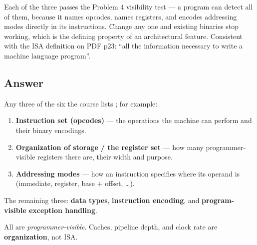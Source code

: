 Each of the three passes the Problem 4 visibility test — a program can detect
all of them, because it names opcodes, names registers, and encodes addressing
modes directly in its instructions. Change any one and existing binaries stop
working, which is the defining property of an architectural feature. Consistent
with the ISA definition on PDF p23: ``all the information necessary to write a
machine language program''.

\subsection*{Answer}

\begin{answerbox}
Any three of the six the course lists ; for example:

\begin{enumerate}[nosep]
  \item \textbf{Instruction set (opcodes)} — the operations the machine can
    perform and their binary encodings.
  \item \textbf{Organization of storage / the register set} — how many
    programmer-visible registers there are, their width and purpose.
  \item \textbf{Addressing modes} — how an instruction specifies where its
    operand is (immediate, register, base $+$ offset, \ldots).
\end{enumerate}

The remaining three: \textbf{data types}, \textbf{instruction encoding}, and
\textbf{program-visible exception handling}.

\medskip
All are \emph{programmer-visible}. Caches, pipeline depth, and clock rate are
\textbf{organization}, not ISA.
\end{answerbox}


